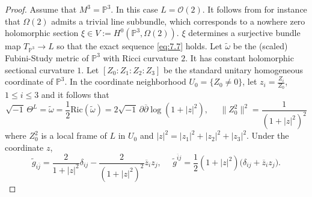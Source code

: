 \documentclass{amsart}
\numberwithin{equation}{section}
\theoremstyle{definition}
\renewcommand{\1}{\mathds{1}}
\renewcommand{\>}{\rightarrow}
\begin{document}
\begin{proof}
Assume that $M^3={\mathbb P}^3$. In this case $L={\mathcal O}(2)$. It follows from \cite{Schneider} for instance that $\Omega (2)$ admits a trivial line subbundle, which corresponds to a nowhere zero holomorphic section $\xi \in V:=H^0({\mathbb P}^3,\Omega (2))$. $\xi$ determines a surjective bundle map $T_{\mathbb{P}^3} \rightarrow L$ so that the exact sequence \eqref{eq:7.7} holds. Let $\tilde{\omega}$  be the (scaled) Fubini-Study metric of ${\mathbb P}^3$ with Ricci curvature $2$. It has constant holomorphic sectional curvature $1$. Let $[Z_0\!:\!Z_1\!:\!Z_2\!:\!Z_3]$ be the standard unitary homogeneous coordinate of ${\mathbb P}^3$. In the coordinate neighborhood $U_0=\{ Z_0\neq 0\}$, let $z_i=\frac{Z_i}{Z_0}$, $1\leq i\leq 3$ and it follows that
$$ \sqrt{-1}\, \Theta^L=\tilde{\omega} = \frac{1}{2}\mbox{Ric}(\tilde{\omega}) = 2\sqrt{-1}\,\partial \overline{\partial} \log (1+|z|^2), \ \ \ \ \ \ \parallel \!Z_0^2\! \parallel^2 = \frac{1}{(1+|z|^2)^2} $$
where $Z_0^2$ is a local frame of $L$ in $U_0$ and $|z|^2= |z_1|^2 + |z_2|^2 + |z_3|^2$. Under the coordinate $z$,
$$ \tilde{g}_{i\overline{j}} = \frac{2}{1+|z|^2}\delta_{ij} - \frac{2}{(1+|z|^2)^2}\overline{z}_iz_j, \ \ \ \ \ \ \tilde{g}^{\overline{i}j} = \frac{1}{2}(1+|z|^2) \big( \delta_{ij} + \overline{z}_iz_j\big)  .$$


\end{proof}
\end{document}
